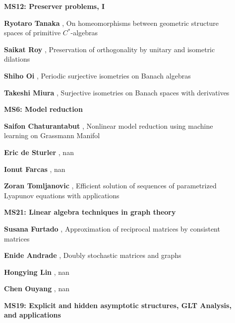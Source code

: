 \documentclass[ILAS2025-program.tex]{subfiles}
\begin{document}
\begin{description}
\begin{description}
    \item[] {\color{mstitle}\textbf{MS12: Preserver problems, I}} 
    \item[] \textbf{Ryotaro Tanaka} , On homeomorphisms between geometric structure spaces of primitive $C^*$-algebras
        \item[] \textbf{Saikat Roy} , Preservation of orthogonality by unitary and isometric dilations
        \item[] \textbf{Shiho Oi} , Periodic surjective isometries on Banach algebras
        \item[] \textbf{Takeshi Miura} , Surjective isometries on Banach spaces with derivatives
        \end{description}
    \begin{description}
    \item[] {\color{mstitle}\textbf{MS6: Model reduction}} 
    \item[] \textbf{Saifon Chaturantabut} , Nonlinear model reduction using machine learning on Grassmann Manifol
        \item[] \textbf{Eric de Sturler} , nan
        \item[] \textbf{Ionut Farcas} , nan
        \item[] \textbf{Zoran Tomljanovic} , Efficient solution of sequences of parametrized Lyapunov equations with applications
        \end{description}
    \begin{description}
    \item[] {\color{mstitle}\textbf{MS21: Linear algebra techniques in graph theory}} 
    \item[] \textbf{Susana Furtado} , Approximation of reciprocal matrices by consistent matrices
        \item[] \textbf{Enide Andrade} , Doubly stochastic matrices and graphs
        \item[] \textbf{Hongying Lin} , nan
        \item[] \textbf{Chen Ouyang} , nan
        \end{description}
    \begin{description}
    \item[] {\color{mstitle}\textbf{MS19: Explicit and hidden asymptotic structures, GLT Analysis, and applications}} 

\end{description}
\end{description}
\end{document}
